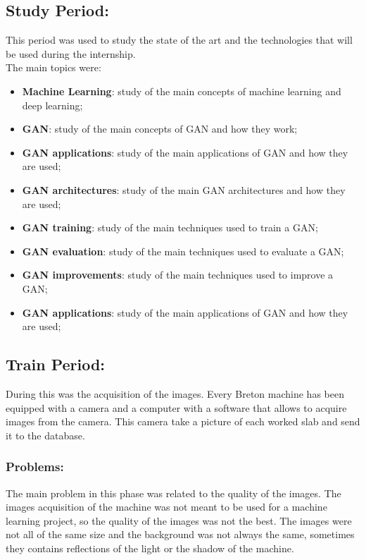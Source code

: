 \subsection{Study Period:}
This period was used to study the state of the art and the technologies that will be used during the internship.\\
The main topics were:
\begin{itemize}
    \item \textbf{Machine Learning}: study of the main concepts of machine learning and deep learning;
    \item \textbf{GAN}: study of the main concepts of GAN and how they work;
    \item \textbf{GAN applications}: study of the main applications of GAN and how they are used;
    \item \textbf{GAN architectures}: study of the main GAN architectures and how they are used;
    \item \textbf{GAN training}: study of the main techniques used to train a GAN;\@
    \item \textbf{GAN evaluation}: study of the main techniques used to evaluate a GAN;\@
    \item \textbf{GAN improvements}: study of the main techniques used to improve a GAN;\@
    \item \textbf{GAN applications}: study of the main applications of GAN and how they are used;
\end{itemize}
\subsection{Train Period:}
During this was the acquisition of the images.
Every Breton machine has been equipped with a camera and a computer with a software that allows to acquire images from the camera.
This camera take a picture of each worked slab and send it to the database.
\subsubsection{Problems:}
The main problem in this phase was related to the quality of the images.
The images acquisition of the machine was not meant to be used for a machine learning project, so the quality of the images was not the best.
The images were not all of the same size and the background was not always the same, sometimes they contains reflections of the light or the shadow of the machine.
